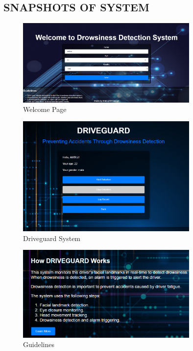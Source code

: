 \documentclass[12pt]{article}
\begin{document}
\newpage
\subsection{SNAPSHOTS OF SYSTEM}

\begin{figure}[h]
\centering
\includegraphics[width=0.8\textwidth]{INDEXSS}
\caption{Welcome Page}
\end{figure}
\FloatBarrier

\begin{figure}[h]
\centering
\includegraphics[width=0.8\textwidth]{DS}
\caption{Driveguard System}
\end{figure}
\FloatBarrier

\begin{figure}[h]
\centering
\includegraphics[width=0.8\textwidth]{G}
\caption{Guidelines}
\end{figure}
\FloatBarrier
\end{document}
